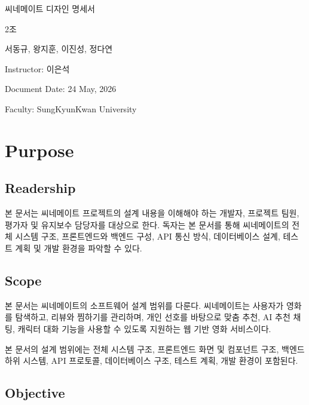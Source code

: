 \documentclass[11pt,a4paper]{article}
\begin{document}
\begin{titlepage}
\centering
\vspace*{2.3cm}
{\Huge 씨네메이트 디자인 명세서\par}
\vspace{1.6cm}
{\Large 2조\par}
\vspace{0.35cm}
{\Large 서동규, 왕지훈, 이진성, 정다연\par}
\vfill
{\large Instructor: 이은석\par}
{\large Document Date: 24 May, 2026\par}
{\large Faculty: SungKyunKwan University\par}
\end{titlepage}
\tableofcontents
\clearpage
\listoffigures
\clearpage
\listoftables
\clearpage
{}
\hypertarget{purpose}{%
\section{Purpose}\label{purpose}}

\hypertarget{readership}{%
\subsection{Readership}\label{readership}}

본 문서는 씨네메이트 프로젝트의 설계 내용을 이해해야 하는 개발자, 프로젝트 팀원, 평가자 및 유지보수 담당자를 대상으로 한다. 독자는 본 문서를 통해 씨네메이트의 전체 시스템 구조, 프론트엔드와 백엔드 구성, API 통신 방식, 데이터베이스 설계, 테스트 계획 및 개발 환경을 파악할 수 있다.

\hypertarget{scope}{%
\subsection{Scope}\label{scope}}

본 문서는 씨네메이트의 소프트웨어 설계 범위를 다룬다. 씨네메이트는 사용자가 영화를 탐색하고, 리뷰와 찜하기를 관리하며, 개인 선호를 바탕으로 맞춤 추천, AI 추천 채팅, 캐릭터 대화 기능을 사용할 수 있도록 지원하는 웹 기반 영화 서비스이다.

본 문서의 설계 범위에는 전체 시스템 구조, 프론트엔드 화면 및 컴포넌트 구조, 백엔드 하위 시스템, API 프로토콜, 데이터베이스 구조, 테스트 계획, 개발 환경이 포함된다.

\hypertarget{objective}{%
\subsection{Objective}\label{objective}}
\end{document}
